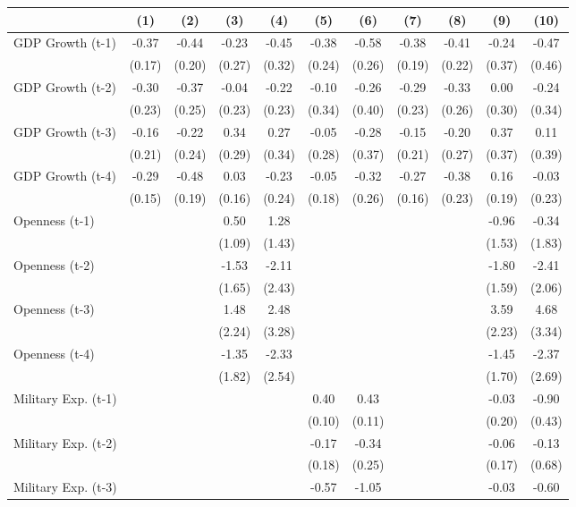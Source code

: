 \begin{tabular}{lcccccccccc}
\toprule
& (1) & (2) & (3) & (4) & (5) & (6) & (7) & (8) & (9) & (10) \\ 
\midrule
GDP Growth (t-1) & -0.37 & -0.44 & -0.23 & -0.45 & -0.38 & -0.58 & -0.38 & -0.41 & -0.24 & -0.47 \\
& (0.17) & (0.20) & (0.27) & (0.32) & (0.24) & (0.26) & (0.19) & (0.22) & (0.37) & (0.46) \\
GDP Growth (t-2) & -0.30 & -0.37 & -0.04 & -0.22 & -0.10 & -0.26 & -0.29 & -0.33 & 0.00 & -0.24 \\
& (0.23) & (0.25) & (0.23) & (0.23) & (0.34) & (0.40) & (0.23) & (0.26) & (0.30) & (0.34) \\
GDP Growth (t-3) & -0.16 & -0.22 & 0.34 & 0.27 & -0.05 & -0.28 & -0.15 & -0.20 & 0.37 & 0.11 \\
& (0.21) & (0.24) & (0.29) & (0.34) & (0.28) & (0.37) & (0.21) & (0.27) & (0.37) & (0.39) \\
GDP Growth (t-4) & -0.29 & -0.48 & 0.03 & -0.23 & -0.05 & -0.32 & -0.27 & -0.38 & 0.16 & -0.03 \\
& (0.15) & (0.19) & (0.16) & (0.24) & (0.18) & (0.26) & (0.16) & (0.23) & (0.19) & (0.23) \\
Openness (t-1) &  &  & 0.50 & 1.28 &  &  &  &  & -0.96 & -0.34 \\
&  &  & (1.09) & (1.43) &  &  &  &  & (1.53) & (1.83) \\
Openness (t-2) &  &  & -1.53 & -2.11 &  &  &  &  & -1.80 & -2.41 \\
&  &  & (1.65) & (2.43) &  &  &  &  & (1.59) & (2.06) \\
Openness (t-3) &  &  & 1.48 & 2.48 &  &  &  &  & 3.59 & 4.68 \\
&  &  & (2.24) & (3.28) &  &  &  &  & (2.23) & (3.34) \\
Openness (t-4) &  &  & -1.35 & -2.33 &  &  &  &  & -1.45 & -2.37 \\
&  &  & (1.82) & (2.54) &  &  &  &  & (1.70) & (2.69) \\
Military Exp. (t-1) &  &  &  &  & 0.40 & 0.43 &  &  & -0.03 & -0.90 \\
&  &  &  &  & (0.10) & (0.11) &  &  & (0.20) & (0.43) \\
Military Exp. (t-2) &  &  &  &  & -0.17 & -0.34 &  &  & -0.06 & -0.13 \\
&  &  &  &  & (0.18) & (0.25) &  &  & (0.17) & (0.68) \\
Military Exp. (t-3) &  &  &  &  & -0.57 & -1.05 &  &  & -0.03 & -0.60 \\

\end{tabular}
